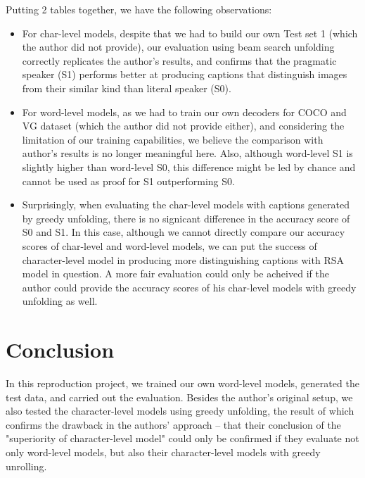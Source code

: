 \documentclass[a4paper]{scrartcl}
\begin{document}
Putting 2 tables together, we have the following observations:
\begin{itemize}
\item For char-level models, despite that we had to build our own Test set 1 (which the author did not provide), our evaluation using beam search unfolding correctly replicates the author's results, and confirms that the pragmatic speaker (S1) performs better at producing captions that distinguish images from their similar kind than literal speaker (S0).
\item For word-level models, as we had to train our own decoders for COCO and VG dataset (which the author did not provide either), and considering the limitation of our training capabilities, we believe the comparison with author's results is no longer meaningful here. Also, although word-level S1 is slightly higher than word-level S0, this difference might be led by chance and cannot be used as proof for S1 outperforming S0.
\item Surprisingly, when evaluating the char-level models with captions generated by greedy unfolding, there is no signicant difference in the accuracy score of S0 and S1. In this case, although we cannot directly compare our accuracy scores of char-level and word-level models, we can put the success of character-level model in producing more distinguishing captions with RSA model in question. A more fair evaluation could only be acheived if the author could provide the accuracy scores of his char-level models with greedy unfolding as well.
\end{itemize}

\section*{Conclusion}
In this reproduction project, we trained our own word-level models, generated the test data, and carried out the evaluation. Besides the author's original setup, we also tested the character-level models using greedy unfolding, the result of which confirms the drawback in the authors' approach -- that their conclusion of the "superiority of character-level model" could only be confirmed if they evaluate not only word-level models, but also their character-level models with greedy unrolling.
\end{document}
